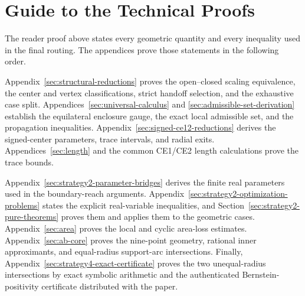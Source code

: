 \section{Guide to the Technical Proofs}
\label{sec:appendix-roadmap}

The reader proof above states every geometric quantity and every inequality
used in the final routing.  The appendices prove those statements in the
following order.

Appendix~\ref{sec:structural-reductions} proves the open--closed scaling
equivalence, the center and vertex classifications, strict handoff selection,
and the exhaustive case split.  Appendices~\ref{sec:universal-calculus} and
\ref{sec:admissible-set-derivation} establish the equilateral enclosure gauge,
the exact local admissible set, and the propagation inequalities.
Appendix~\ref{sec:signed-ce12-reductions} derives the signed-center parameters,
trace intervals, and radial exits.  Appendices~\ref{sec:length} and the common
CE1/CE2 length calculations prove the trace bounds.

Appendix~\ref{sec:strategy2-parameter-bridges} derives the finite real
parameters used in the boundary-reach arguments.
Appendix~\ref{sec:strategy2-optimization-problems} states the explicit
real-variable inequalities, and Section~\ref{sec:strategy2-pure-theorems}
proves them and applies them to the geometric cases.  Appendix~\ref{sec:area}
proves the local and cyclic area-loss estimates.  Appendix~\ref{sec:ab-core}
proves the nine-point geometry, rational inner approximants, and equal-radius
support-arc intersections.  Finally,
Appendix~\ref{sec:strategy4-exact-certificate} proves the two unequal-radius
intersections by exact symbolic arithmetic and the authenticated
Bernstein-positivity certificate distributed with the paper.
